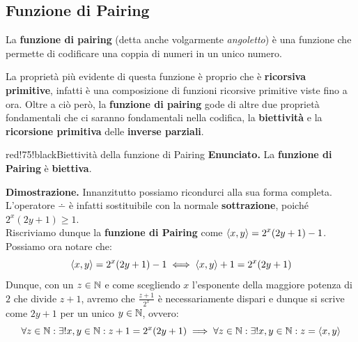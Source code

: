 \subsection{Funzione di Pairing}

La \textbf{funzione di pairing} (detta anche volgarmente \textit{angoletto}) è una funzione che permette di codificare una coppia di numeri in un unico numero.
%

La proprietà più evidente di questa funzione è proprio che è \textbf{ricorsiva primitive}, infatti è una composizione di funzioni ricorsive primitive viste fino a ora.
Oltre a ciò però, la \textbf{funzione di pairing} gode di altre due proprietà fondamentali che ci saranno fondamentali nella codifica, la \textbf{biettività} e la \textbf{ricorsione primitiva} delle \textbf{inverse parziali}.

\begin{halfframedbox}{red!75!black}{Biettività della funzione di Pairing}\label{Biettività della funzione di Pairing}
  \textbf{Enunciato.} La \textbf{funzione di Pairing} è \textbf{biettiva}.
  \begin{center}
    \textcolor{red!75!black}{\hdashrule[0.5ex]{18cm}{1pt}{3mm 3pt 1mm 2pt}}
  \end{center}

  \textbf{Dimostrazione.} Innanzitutto possiamo ricondurci alla sua forma completa. L'operatore \(\dotminus\) è infatti sostituibile con la normale \textbf{sottrazione}, poiché \(2^x(2y+1)\geq 1\).\\
   Riscriviamo dunque la \textbf{funzione di Pairing} come \(\displaystyle{\left\langle{ x,y }\right\rangle} =2^x(2y+1)-1\).\\
   Possiamo ora notare che:
   \begin{equation}
    \displaystyle{\left\langle{ x,y }\right\rangle} =2^x(2y+1)-1 \iff \displaystyle{\left\langle{ x,y }\right\rangle} +1= 2^x(2y+1)
   \end{equation}
   Dunque, con un \(z\in\mathbb{N}\) e come scegliendo \(x\) l'esponente della maggiore potenza di \(2\) che divide \(z+1\), avremo che \(\frac{z+1}{2^x}\) è necessariamente dispari e dunque si scrive come \(2y+1\) per un unico \(y\in\mathbb{N}\), ovvero:
   \begin{equation}
    \forall z \in \mathbb{N}: \exists! x,y \in \mathbb{N}: z+1=2^x(2y+1)\implies \forall z \in \mathbb{N}: \exists! x,y \in \mathbb{N}: z=\displaystyle{\left\langle{ x,y }\right\rangle}
   \end{equation}
\end{halfframedbox}

